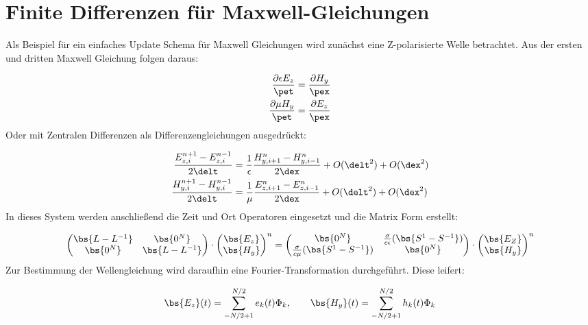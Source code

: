 \section{Finite Differenzen f\"ur Maxwell-Gleichungen}
Als Beispiel f\"ur ein einfaches Update Schema f\"ur Maxwell Gleichungen wird zun\"achst eine Z-polarisierte Welle betrachtet. Aus der ersten und dritten Maxwell Gleichung folgen daraus:
\par
\begin{align*}
	\frac{\partial \epsilon E_z}{\pet} &= \frac{\partial H_y}{\pex} \\
	\frac{\partial \mu H_y}{\pet} &= \frac{\partial E_z}{\pex}
\end{align*}
Oder mit Zentralen Differenzen als Differenzengleichungen ausgedr\"uckt:
\par
\begin{align*}
	\frac{E^{n+1}_{z,i} - E^{n-1}_{z,i}}{2\delt} &= \frac{1}{\epsilon}\frac{H^n_{y,i+1} - H^n_{y,i-1}}{2\dex} + O(\delt^2) + O(\dex^2) \\
	\frac{H^{n+1}_{y,i} - H^{n-1}_{y,i}}{2\delt} &= \frac{1}{\mu}\frac{E^n_{z,i+1} - E^n_{z,i-1}}{2\dex} + O(\delt^2) + O(\dex^2)
\end{align*}
In dieses System werden anschlie\ss{}end die Zeit und Ort Operatoren eingesetzt und die Matrix Form erstellt:
\par
\begin{equation*}
	\begin{pmatrix} 
		\bs{L-L^{-1}} & \bs{0^N} \\
		\bs{0^N} & \bs{L-L^{-1}}
	\end{pmatrix}
	\cdot
	\begin{pmatrix}
		\bs{E_z} \\
		\bs{H_y}
	\end{pmatrix}^n
	=
	\begin{pmatrix}
		\bs{ 0^N } & \frac{\sigma}{c\epsilon}(\bs{S^1-S^{-1}}) \\
		\frac{\sigma}{c\mu}(\bs{S^1-S^{-1}}) & \bs{ 0^N }
	\end{pmatrix}
	\cdot
	\begin{pmatrix}
		\bs{E_Z} \\
		\bs{H_y}
	\end{pmatrix}^n
\end{equation*}
Zur Bestimmung der Wellengleichung wird daraufhin eine Fourier-Transformation durchgef\"uhrt. Diese leifert:
\par
\begin{equation*}
	\bs{E_z}(t) = \sum_{-N/2+1}^{N/2} e_k(t)\Phi_k,~~~~~~ \bs{H_y}(t) = \sum_{-N/2+1}^{N/2} h_k(t)\Phi_k
\end{equation*}
